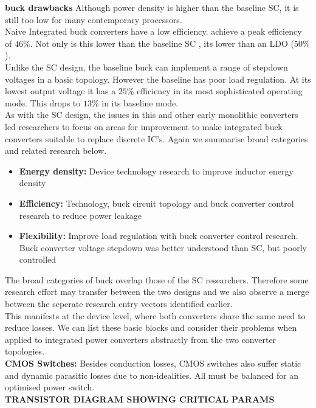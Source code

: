 \documentclass[letterpaper,twocolumn,10pt]{article}
\begin{document}
\textbf{buck drawbacks} Although power density is higher than the baseline SC, it is still too low for many contemporary processors. \\
Naive Integrated buck converters have a low efficiency. \cite{Alimadadi2008} achieve a peak efficiency of $46\%$. Not only is this lower than the baseline SC \cite{Viraj2007}, its lower than an LDO ($50\%$).\\
Unlike the SC design, the baseline buck can implement a range of stepdown voltages in a basic topology. However the baseline has poor load regulation. At its lowest output voltage it has a $25\%$ efficiency in its most sophisticated operating mode. This drops to $13\%$ in its baseline mode.\\ 
As with the SC design, the issues in this and other early monolithic converters led researchers to focus on areas for improvement to make integrated buck converters suitable to replace discrete IC's. Again we summarise broad categories and related research below.
\begin{itemize}
\item \textbf{Energy density: }Device technology research to improve inductor energy density
\item \textbf{Efficiency: }Technology, buck circuit topology and buck converter control research to reduce power leakage
\item \textbf{Flexibility: }Improve load regulation with buck converter control research. Buck converter voltage stepdown was better understood than SC, but poorly controlled
\end{itemize}
The broad categories of buck overlap those of the SC researchers. Therefore some research effort may transfer between the two designs and we also observe a merge between the seperate research entry vectors identified earlier.\\
This manifests at the device level, where both converters share the same need to reduce losses. We can list these basic blocks and consider their problems when applied to integrated power converters abstractly from the two converter topologies.\\  
\textbf{CMOS Switches: }
Besides conduction losses, CMOS switches also suffer static and dynamic parasitic losses due to non-idealities. All must be balanced for an optimised power switch.\\ %
\textbf{TRANSISTOR DIAGRAM SHOWING CRITICAL PARAMS}\\
\end{document}
